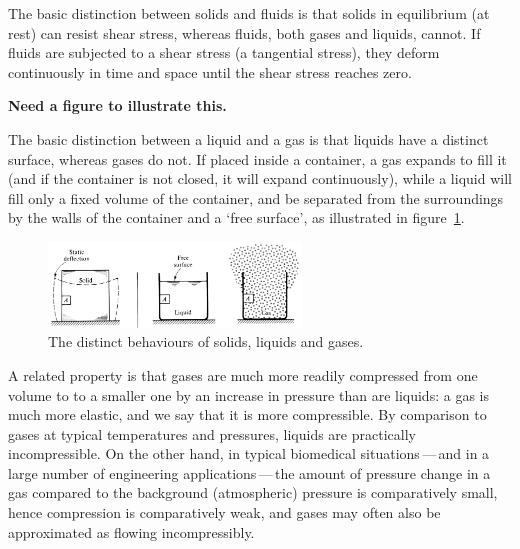 \documentclass[a4paper,11pt]		{report}
\begin{document}
The basic distinction between solids and fluids is that solids in
equilibrium (\ie at rest) can resist shear stress, whereas fluids,
both gases and liquids, cannot. If fluids are subjected to a shear
stress (\ie a tangential stress), they deform continuously in time and
space until the shear stress reaches zero.


{\bf Need a figure to illustrate this.}


The basic distinction between a liquid and a gas is that liquids have
a distinct surface, whereas gases do not. If placed inside a
container, a gas expands to fill it (and if the container is not
closed, it will expand continuously), while a liquid will fill only a
fixed volume of the container, and be separated from the surroundings
by the walls of the container and a `free surface', as illustrated in
figure~\ref{fig.slg}.

\begin{figure}
\begin{center}
\includegraphics[width=0.6\textwidth]{White-1.1.eps}
\end{center}
\caption{The distinct behaviours of solids, liquids and
gases. \citep[From][]{white86}}
\label{fig.slg}
\end{figure}

A related property is that gases are much more readily compressed from
one volume to to a smaller one by an increase in pressure than are
liquids: a gas is much more elastic, and we say that it is more
compressible. By comparison to gases at typical temperatures and
pressures, liquids are practically incompressible. On the other hand,
in typical biomedical situations\,---\,and in a large number of
engineering applications\,---\,the amount of pressure change in a gas
compared to the background (atmospheric) pressure is comparatively
small, hence compression is comparatively weak, and gases may often
also be approximated as flowing incompressibly.
\end{document}
